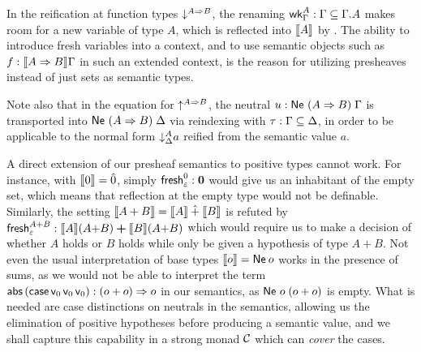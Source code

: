 \documentclass[sigplan,screen,fleqn]{acmart}
\begin{document}
In the reification at function types
$\down{A \To B}$,
the renaming $\twk^A_\Gamma : \Gamma \sublist \cext \Gamma A$
makes room
for a new variable of type $A$, which is reflected into $\den A$ by
.
The ability to introduce fresh variables into a context, and to use
semantic objects such as $f : \den{A \To B}\Gamma$ in such an extended
context, is the reason for utilizing presheaves instead of just sets
as semantic types.

Note also that in the equation for $\up{A \To B}$,
the neutral $u : \Ne {(A \To B)} \Gamma$ is
transported into $\Ne {(A \To B)} \Delta$ via reindexing with
$\tau : \Gamma \sublist \Delta$, in order to be applicable to the normal form
$\down[\Delta]A a$
reified from the semantic value $a$.

A direct extension of our presheaf semantics to positive types cannot
work.  For instance, with $\den \tyzero = \hat0$, simply
$\tfresh^{\tyzero}_{\cempty} : \bzero$
would give us an
inhabitant of the empty set, which means that reflection at the empty
type would not be definable.  Similarly, the setting
$\den{A + B} = \den A \hatplus \den B$ is refuted by
$\tfresh^{A + B}_{\cempty} : \den A (A{+}B) \bplus \den B (A{+}B)$
which would require us to make a decision of whether $A$ holds or $B$ holds
while only be given a hypothesis of type $A + B$.
Not even the usual interpretation of base types $\den o = \tNe\,o$
works in the presence of sums, as we would not be able to interpret
the term
$\tabs\,(\tcase\,\vv0\,\vv0\,\vv0) :
(o+o) \To o$ in our semantics, as $\Ne o (o+o)$ is empty.
What is needed are case distinctions on neutrals in the semantics,
allowing us the elimination of positive hypotheses before producing a
semantic value,
and we shall capture this capability in a strong monad $\C$
which can \emph{cover} the cases.
\end{document}
